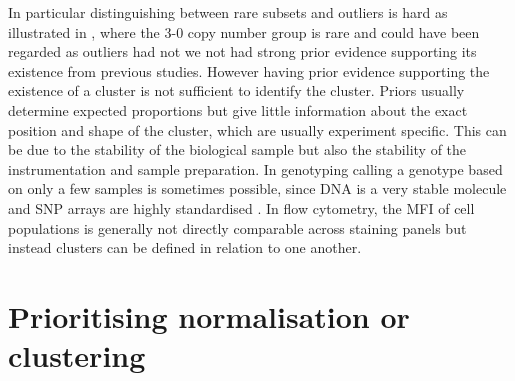 In particular distinguishing between rare subsets and outliers is hard as illustrated in ,
where the 3-0 copy number group is rare and could have been regarded as outliers had not we not had strong prior evidence supporting its existence
from previous studies.
However having prior evidence supporting the existence of a cluster is not sufficient to identify the cluster.
Priors usually determine expected proportions but give little information about the exact position and shape of the cluster, which are usually experiment
specific.
This can be due to the stability of the biological sample but also the stability of the instrumentation and sample preparation.
In genotyping calling a genotype based on only a few samples is sometimes possible, since DNA is a very stable molecule and SNP arrays are highly standardised
\citep{Di:2005uj,Giannoulatou:2008ty}.
In flow cytometry, the MFI of cell populations is generally not directly comparable across staining panels but instead clusters can be defined in relation to one another.


\section{Prioritising normalisation or clustering}


